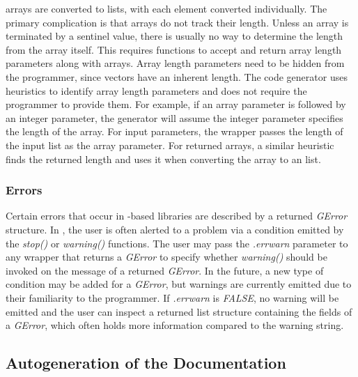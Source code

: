 \documentclass[article]{jss}
\begin{document}
 arrays are converted to  lists, with each element
converted individually. The primary complication is that  arrays 
do not track their length. Unless an array is terminated by a sentinel value,
there is usually no way to determine the length from the array itself. This 
requires  functions to accept and return array length parameters
along with arrays. Array length parameters need to be hidden from the
 programmer, since  vectors have an inherent length.
The code generator uses heuristics to identify array length parameters and
does not require the  programmer to provide them. For example,
if an array parameter is followed by an integer parameter, the generator
will assume the integer parameter specifies the length of the array. For input
parameters, the wrapper passes the length of the input  list as
the array parameter. For returned arrays, a similar heuristic finds the returned
length and uses it when converting the array to an  list.

\subsubsection{Errors}

Certain errors that occur in -based libraries are described by a 
returned \emph{GError} structure. In , the user is often alerted to
a problem via a condition emitted by the \emph{stop()} or \emph{warning()} functions. 
The user may pass the \emph{.errwarn} parameter to any wrapper that returns a 
\emph{GError} to specify whether \emph{warning()} should be invoked on the
message of a returned \emph{GError}. In the future, a new type of condition may 
be added for a \emph{GError}, but warnings
are currently emitted due to their familiarity to the  programmer.
If \emph{.errwarn} is \emph{FALSE}, no warning will be emitted and the user can
inspect a returned list structure containing the fields of a \emph{GError}, 
which often holds more information compared to the warning string.

\subsection{Autogeneration of the Documentation}
\end{document}
